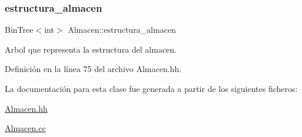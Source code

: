 \subsubsection{\texorpdfstring{estructura\+\_\+almacen}{estructura\_almacen}}
{\footnotesize\ttfamily Bin\+Tree$<$int$>$ Almacen\+::estructura\+\_\+almacen\hspace{0.3cm}{\ttfamily [private]}}



Arbol que representa la estructura del almacen. 



Definición en la línea 75 del archivo Almacen.\+hh.



La documentación para esta clase fue generada a partir de los siguientes ficheros\+:\begin{DoxyCompactItemize}
\item 
\hyperlink{_almacen_8hh}{Almacen.\+hh}\item 
\hyperlink{_almacen_8cc}{Almacen.\+cc}\end{DoxyCompactItemize}
